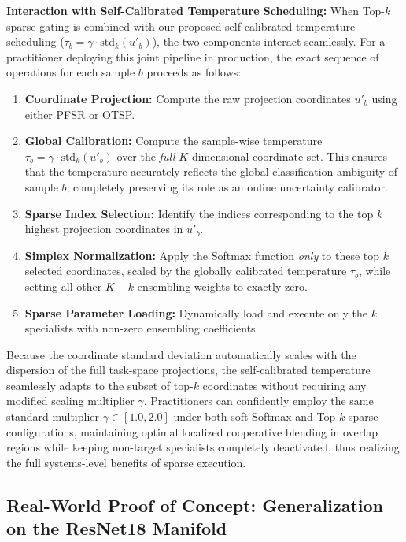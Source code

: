\textbf{Interaction with Self-Calibrated Temperature Scheduling:} When Top-$k$ sparse gating is combined with our proposed self-calibrated temperature scheduling ($\tau_b = \gamma \cdot \text{std}_k(u'_{b})$), the two components interact seamlessly. For a practitioner deploying this joint pipeline in production, the exact sequence of operations for each sample $b$ proceeds as follows:
\begin{enumerate}
    \item \textbf{Coordinate Projection:} Compute the raw projection coordinates $u'_{b}$ using either PFSR or OTSP.
    \item \textbf{Global Calibration:} Compute the sample-wise temperature $\tau_b = \gamma \cdot \text{std}_k(u'_{b})$ over the \textit{full} $K$-dimensional coordinate set. This ensures that the temperature accurately reflects the global classification ambiguity of sample $b$, completely preserving its role as an online uncertainty calibrator.
    \item \textbf{Sparse Index Selection:} Identify the indices corresponding to the top $k$ highest projection coordinates in $u'_{b}$.
    \item \textbf{Simplex Normalization:} Apply the Softmax function \textit{only} to these top $k$ selected coordinates, scaled by the globally calibrated temperature $\tau_b$, while setting all other $K - k$ ensembling weights to exactly zero.
    \item \textbf{Sparse Parameter Loading:} Dynamically load and execute only the $k$ specialists with non-zero ensembling coefficients.
\end{enumerate}
Because the coordinate standard deviation automatically scales with the dispersion of the full task-space projections, the self-calibrated temperature seamlessly adapts to the subset of top-$k$ coordinates without requiring any modified scaling multiplier $\gamma$. Practitioners can confidently employ the same standard multiplier $\gamma \in [1.0, 2.0]$ under both soft Softmax and Top-$k$ sparse configurations, maintaining optimal localized cooperative blending in overlap regions while keeping non-target specialists completely deactivated, thus realizing the full systems-level benefits of sparse execution.

\subsection{Real-World Proof of Concept: Generalization on the ResNet18 Manifold}
\label{sec:resnet_poc}

